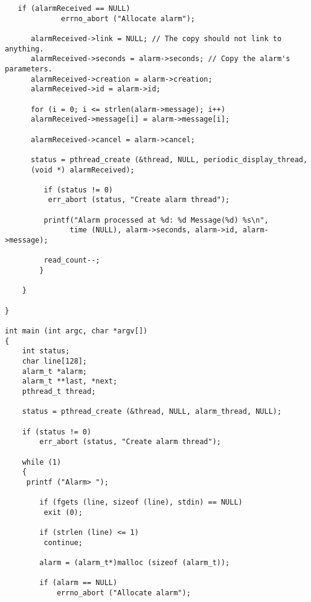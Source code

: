 \documentclass[11pt]{article}
\begin{document}
\begin{lstlisting}
   if (alarmReceived == NULL)
             errno_abort ("Allocate alarm");
             
      alarmReceived->link = NULL; // The copy should not link to anything.
      alarmReceived->seconds = alarm->seconds; // Copy the alarm's parameters.
      alarmReceived->creation = alarm->creation;
      alarmReceived->id = alarm->id;
        
      for (i = 0; i <= strlen(alarm->message); i++)
      alarmReceived->message[i] = alarm->message[i];
          
      alarmReceived->cancel = alarm->cancel;
          
      status = pthread_create (&thread, NULL, periodic_display_thread, 
      (void *) alarmReceived);
         
         if (status != 0)
          err_abort (status, "Create alarm thread");
          
         printf("Alarm processed at %d: %d Message(%d) %s\n",
               time (NULL), alarm->seconds, alarm->id, alarm->message);
               
         read_count--;
        }
        
    }
    
}

int main (int argc, char *argv[])
{
    int status;
    char line[128];
    alarm_t *alarm;
    alarm_t **last, *next;
    pthread_t thread;

    status = pthread_create (&thread, NULL, alarm_thread, NULL);
    
    if (status != 0)
        err_abort (status, "Create alarm thread");
        
    while (1)
    {
     printf ("Alarm> ");
     
        if (fgets (line, sizeof (line), stdin) == NULL)
         exit (0);
        
        if (strlen (line) <= 1)
         continue;
        
        alarm = (alarm_t*)malloc (sizeof (alarm_t));
        
        if (alarm == NULL)
            errno_abort ("Allocate alarm");


\end{lstlisting}
\end{document}
